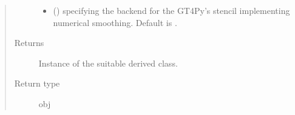 \documentclass[letterpaper,10pt,english]{sphinxmanual}
\begin{document}
\begin{fulllineitems}
\begin{fulllineitems}
\begin{quote}
\begin{description}
\begin{itemize}
\item {} 
 () \textendash{}  specifying the backend for the GT4Py’s stencil implementing numerical
smoothing. Default is .

\end{itemize}

\item[{Returns}] \leavevmode
Instance of the suitable derived class.

\item[{Return type}] \leavevmode
obj

\end{description}\end{quote}

\end{fulllineitems}


\end{fulllineitems}

\end{document}

